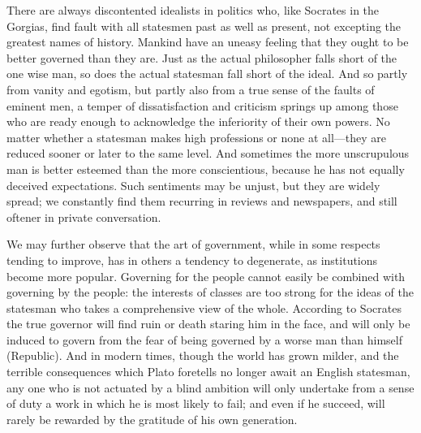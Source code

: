 \documentclass[11pt,letter]{article}
\begin{document}
\par  There are always discontented idealists in politics who, like Socrates in the Gorgias, find fault with all statesmen past as well as present, not excepting the greatest names of history. Mankind have an uneasy feeling that they ought to be better governed than they are. Just as the actual philosopher falls short of the one wise man, so does the actual statesman fall short of the ideal. And so partly from vanity and egotism, but partly also from a true sense of the faults of eminent men, a temper of dissatisfaction and criticism springs up among those who are ready enough to acknowledge the inferiority of their own powers. No matter whether a statesman makes high professions or none at all—they are reduced sooner or later to the same level. And sometimes the more unscrupulous man is better esteemed than the more conscientious, because he has not equally deceived expectations. Such sentiments may be unjust, but they are widely spread; we constantly find them recurring in reviews and newspapers, and still oftener in private conversation.

\par  We may further observe that the art of government, while in some respects tending to improve, has in others a tendency to degenerate, as institutions become more popular. Governing for the people cannot easily be combined with governing by the people: the interests of classes are too strong for the ideas of the statesman who takes a comprehensive view of the whole. According to Socrates the true governor will find ruin or death staring him in the face, and will only be induced to govern from the fear of being governed by a worse man than himself (Republic). And in modern times, though the world has grown milder, and the terrible consequences which Plato foretells no longer await an English statesman, any one who is not actuated by a blind ambition will only undertake from a sense of duty a work in which he is most likely to fail; and even if he succeed, will rarely be rewarded by the gratitude of his own generation.
\end{document}
